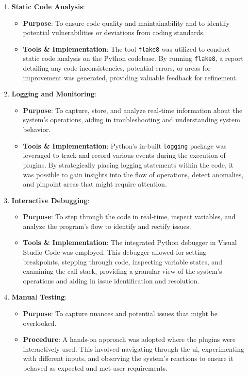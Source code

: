 \documentclass[
  a4paper,  %
  twoside,  %
  bibliography=totoc,
  headsepline,
  cleardoublepage=empty,
  parskip=half,
  draft=false
]{scrbook}
\begin{document}
\begin{enumerate}
    \item \textbf{Static Code Analysis}:
    \begin{itemize}
        \item \textbf{Purpose}: To ensure code quality and maintainability and to identify potential vulnerabilities or deviations from coding standards.
        \item \textbf{Tools \& Implementation}: The tool \texttt{flake8} was utilized to conduct static code analysis on the Python codebase.
        By running \texttt{flake8}, a report detailing any code inconsistencies, potential errors, or areas for improvement was generated, providing valuable feedback for refinement.
    \end{itemize}

    \item \textbf{Logging and Monitoring}:
    \begin{itemize}
        \item \textbf{Purpose}: To capture, store, and analyze real-time information about the system's operations, aiding in troubleshooting and understanding system behavior.
        \item \textbf{Tools \& Implementation}: Python's in-built \texttt{logging} package was leveraged to track and record various events during the execution of plugins.
        By strategically placing logging statements within the code, it was possible to gain insights into the flow of operations, detect anomalies, and pinpoint areas that might require attention.
    \end{itemize}

    \item \textbf{Interactive Debugging}:
    \begin{itemize}
        \item \textbf{Purpose}: To step through the code in real-time, inspect variables, and analyze the program's flow to identify and rectify issues.
        \item \textbf{Tools \& Implementation}: The integrated Python debugger in Visual Studio Code was employed.
        This debugger allowed for setting breakpoints, stepping through code, inspecting variable states, and examining the call stack, providing a granular view of the system's operations and aiding in issue identification and resolution.
    \end{itemize}

    \item \textbf{Manual Testing}:
    \begin{itemize}
        \item \textbf{Purpose}: To capture nuances and potential issues that might be overlooked.
        \item \textbf{Procedure}: A hands-on approach was adopted where the plugins were interactively used.
        This involved navigating through the \gls{ui}, experimenting with different inputs, and observing the system's reactions to ensure it behaved as expected and met user requirements.
    \end{itemize}
\end{enumerate}
\end{document}

